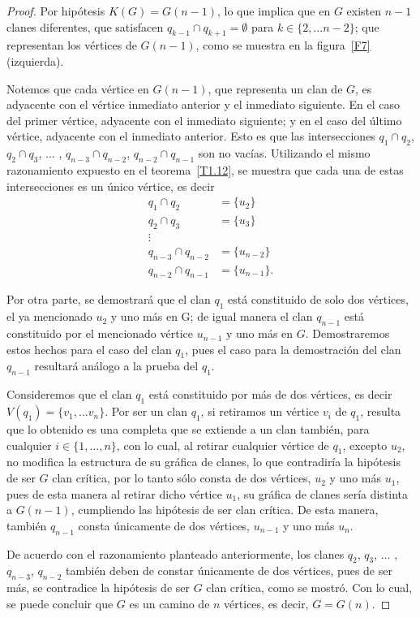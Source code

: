 \documentclass[12pt]{book}
\theoremstyle{definition}
\begin{document}
\begin{proof}
Por hipótesis $K(G)=G(n-1)$, lo que implica que en $G$ existen $n-1$ clanes diferentes, que satisfacen $q_{k-1}\cap q_{k+1}=\emptyset$ para $k\in\{2,\dots n-2\}$; que representan los vértices de $G(n-1)$, como se muestra en la figura~\ref{F7} (izquierda).

Notemos que cada vértice en $G(n-1)$, que representa un clan de $G$, es adyacente con el vértice inmediato anterior y el inmediato siguiente. En el caso del primer vértice, adyacente con el inmediato siguiente; y en el caso del último vértice, adyacente con el inmediato anterior. Esto es que las intersecciones $q_1\cap q_2$, $q_2\cap q_3$, $\dots$ , $q_{n-3}\cap q_{n-2}$, $q_{n-2}\cap q_{n-1}$ son no vacías. Utilizando el mismo razonamiento expuesto en el teorema~\ref{T1.12}, se muestra que cada una de estas intersecciones es un único vértice, es decir
\begin{equation*}
\begin{aligned}
q_1\cap q_2 &= \{u_2\} \\
q_2\cap q_3 &= \{u_3\} \\
\vdots \\
q_{n-3}\cap q_{n-2} &= \{u_{n-2}\} \\
q_{n-2}\cap q_{n-1} &= \{u_{n-1}\}.
\end{aligned}
\end{equation*}

Por otra parte, se demostrará que el clan $q_1$ está constituido de solo dos vértices, el ya mencionado $u_2$ y uno más en G; de igual manera el clan $q_{n-1}$ está constituido por el mencionado vértice $u_{n-1}$ y uno más en $G$. Demostraremos estos hechos para el caso del clan $q_1$, pues el caso para la demostración del clan $q_{n-1}$ resultará análogo a la prueba del $q_1$. 

Consideremos que el clan $q_1$ está constituido por más de dos vértices, es decir $V(q_1)=\{v_1,\dots v_n\}$. Por ser un clan $q_1$, si retiramos un vértice $v_i$ de $q_1$, resulta que lo obtenido es una completa que se extiende a un clan también, para cualquier $i\in \{1,\dots,n\}$, con lo cual, al retirar cualquier vértice de $q_1$, excepto $u_2$, no modifica la estructura de su gráfica de clanes, lo que contradiría la hipótesis de ser $G$ clan crítica, por lo tanto sólo consta de dos vértices, $u_2$ y uno más $u_1$, pues de esta manera al retirar dicho vértice $u_1$, su gráfica de clanes sería distinta a $G(n-1)$, cumpliendo las hipótesis de ser clan crítica. 
De esta manera, también $q_{n-1}$ consta únicamente de dos vértices, $u_{n-1}$ y uno más $u_n$.

De acuerdo con el razonamiento planteado anteriormente, los clanes $q_2$, $q_3$, $\dots$ , $q_{n-3}$, $q_{n-2}$ también deben de constar únicamente de dos vértices, pues de ser más, se contradice la hipótesis de ser $G$ clan crítica, como se mostró. Con lo cual, se puede concluir que $G$ es un camino de $n$ vértices, es decir, $G=G(n)$.
\end{proof}
\end{document}
